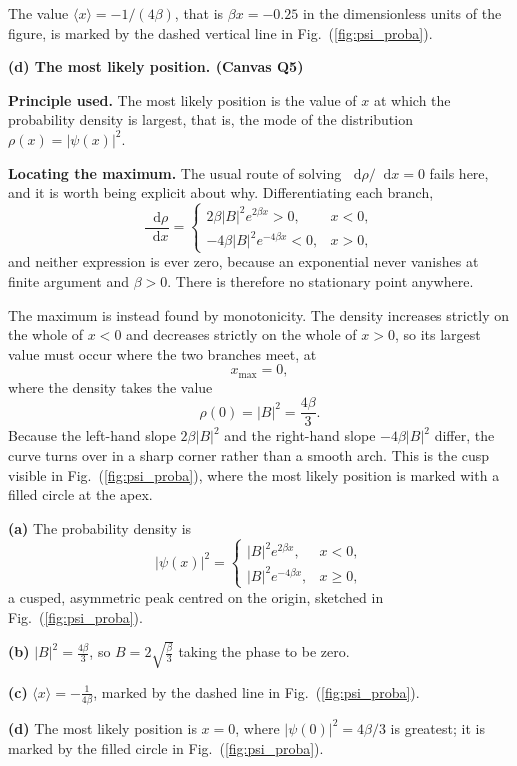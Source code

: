 \documentclass[12pt]{article}
\renewcommand{\d}{\mathop{}\!\mathrm{d}}
\newcommand{\problemsep}{\vspace{0.8em}}
\begin{document}
\begin{solutionbox}
The value $\langle x\rangle=-1/(4\beta)$, that is $\beta x=-0.25$ in the dimensionless units of the figure, is marked by the dashed vertical line in Fig.~(\ref{fig:psi_proba}).

\problemsep
\textbf{(d) The most likely position. \hfill (Canvas Q5)}

\textbf{Principle used.} The most likely position is the value of $x$ at which the probability density is largest, that is, the mode of the distribution $\rho(x)=|\psi(x)|^{2}$.

\textbf{Locating the maximum.} The usual route of solving $\d\rho/\d x=0$ fails here, and it is worth being explicit about why. Differentiating each branch,
\[
    \frac{\d\rho}{\d x}=
    \begin{cases}
        2\beta|B|^{2}e^{2\beta x}>0, & x<0,\\[0.3em]
        -4\beta|B|^{2}e^{-4\beta x}<0, & x>0,
    \end{cases}
\]
and neither expression is ever zero, because an exponential never vanishes at finite argument and $\beta>0$. There is therefore no stationary point anywhere.

The maximum is instead found by monotonicity. The density increases strictly on the whole of $x<0$ and decreases strictly on the whole of $x>0$, so its largest value must occur where the two branches meet, at
\[
    x_{\text{max}}=0 ,
\]
where the density takes the value
\[
    \rho(0)=|B|^{2}=\frac{4\beta}{3} .
\]
Because the left-hand slope $2\beta|B|^{2}$ and the right-hand slope $-4\beta|B|^{2}$ differ, the curve turns over in a sharp corner rather than a smooth arch. This is the cusp visible in Fig.~(\ref{fig:psi_proba}), where the most likely position is marked with a filled circle at the apex.
\end{solutionbox}

\begin{answerbox}
\textbf{(a)} The probability density is
\[
    |\psi(x)|^{2}=
    \begin{cases}
        |B|^{2}e^{2\beta x}, & x<0,\\[0.2em]
        |B|^{2}e^{-4\beta x}, & x\ge 0,
    \end{cases}
\]
a cusped, asymmetric peak centred on the origin, sketched in Fig.~(\ref{fig:psi_proba}).

\textbf{(b)} $\displaystyle |B|^{2}=\frac{4\beta}{3}$, so $\displaystyle B=2\sqrt{\frac{\beta}{3}}$ taking the phase to be zero.

\textbf{(c)} $\displaystyle \langle x\rangle=-\frac{1}{4\beta}$, marked by the dashed line in Fig.~(\ref{fig:psi_proba}).

\textbf{(d)} The most likely position is $x=0$, where $|\psi(0)|^{2}=4\beta/3$ is greatest; it is marked by the filled circle in Fig.~(\ref{fig:psi_proba}).
\end{answerbox}
\end{document}
